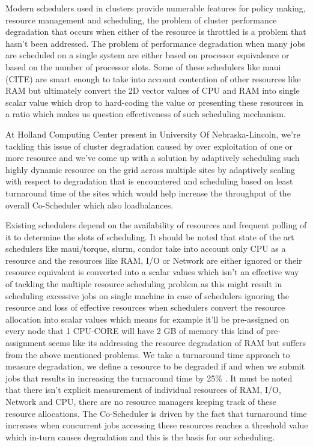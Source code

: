 \documentclass[ms,electronic,double]{nuthesis}
\begin{document}
Modern schedulers used in clusters provide numerable features for policy making, resource management 
and scheduling, the problem of cluster 
performance degradation that occurs when either of the resource is throttled is a problem that hasn't been 
addressed. The problem of performance degradation when many jobs are scheduled on a single system 
are either based on processor equivalence or based on the number of processor slots. Some of 
these schedulers like maui (CITE) are smart enough to take into account contention of other 
resources like RAM but ultimately convert the 2D vector values of CPU and RAM 
into single scalar value which drop to hard-coding the value or presenting these resources
in a ratio which makes us question effectiveness of such scheduling mechanism. 

At Holland Computing Center present in University Of Nebraska-Lincoln, we're 
tackling this issue of cluster degradation caused by 
over exploitation of one or more resource and we've come up with a solution by adaptively scheduling 
such highly dynamic resource on the grid across multiple sites by adaptively scaling with respect to
degradation that is encountered and scheduling based on least turnaround time of the sites which would help increase 
the throughput of the overall Co-Scheduler which also loadbalances.

Existing schedulers depend on the availability of resources and frequent polling 
of it to determine the slots of scheduling. It should be noted that state of the art 
schedulers like maui/torque, slurm, condor take into account only CPU as a 
resource and the resources like RAM, I/O or Network are either ignored or 
their resource equivalent is converted into a scalar values which isn't an effective way of tackling the 
multiple resource scheduling problem as this might result in scheduling excessive jobs 
on single machine in case of schedulers ignoring the resource and loss of 
effective resources when schedulers convert the resource allocation into scalar 
values which means for example it'll be pre-assigned on every node that 1 CPU-CORE will have 2 GB of
memory this kind of pre-assignment seems like its addressing the resource degradation of RAM but suffers 
from the above mentioned problems.
We take a turnaround time approach to measure degradation, we define a resource 
to be degraded if and when we submit jobs that results in increasing the 
turnaround time by 25\% . It must be 
noted that there isn't explicit measurement of individual resources of RAM, I/O, 
Network and CPU, there are no resource managers keeping track of these resource allocations. 
The Co-Scheduler is driven by the fact that turnaround time increases when 
concurrent jobs accessing these resources reaches a threshold value which in-turn causes 
degradation and this is the basis for our scheduling.
\end{document}
